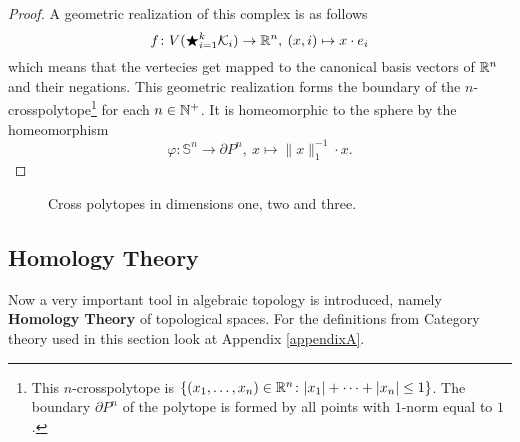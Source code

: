 \begin{proof}
  A geometric realization of this complex is as follows
  \begin{equation*}
    f\colon V(\bigstar_{i=1}^k \mathcal{K}_i) \to \mathbb{R}^n, \: (x, i) \mapsto x \cdot e_i
  \end{equation*}
  which means that the vertecies get mapped to the canonical basis vectors of $\mathbb{R}^n$ and their negations. 
  This geometric realization forms the boundary of the $n$-crosspolytope\footnote{This $n$-crosspolytope is $\{(x_1, \ldots, x_n) \in \mathbb{R}^n\colon |x_1| + \cdots + |x_n| \leq 1 \}$. The boundary $\partial P^n$ of the polytope is formed by all points with $1$-norm equal to $1$.} for each $n \in \mathbb{N}^+$. It is homeomorphic to the sphere by the homeomorphism
  \begin{equation*}
    \varphi\colon \mathbb{S}^n \to \partial P^n, \: x \mapsto \lVert x \rVert_1^{-1} \cdot x. 
  \end{equation*}
\end{proof}

\begin{figure}[ht!]
  \centering
  \caption{Cross polytopes in dimensions one, two and three.}
  \label{fig:cross}
\end{figure}

\subsection{Homology Theory}
Now a very important tool in algebraic topology is introduced, namely \textbf{Homology Theory} of topological spaces. For the definitions from Category theory used in this section look at Appendix \ref{appendixA}. 

